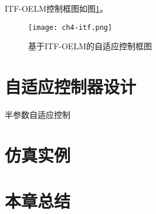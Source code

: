 ITF-OELM控制框图如图\ref{fig.itf-oelm}。
\begin{figure}[!htb]
  \centering
  \texttt{[image: ch4-itf.png]}\\	 %
  \caption{基于ITF-OELM的自适应控制框图}
  \label{fig.itf-oelm}
\end{figure}

\section{自适应控制器设计}
半参数自适应控制

\section{仿真实例}

\section{本章总结}